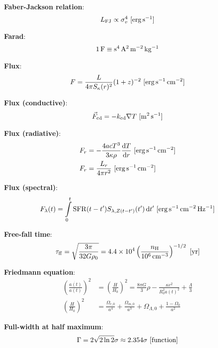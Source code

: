 \documentclass[a4paper,10pt]{article}
\begin{document}
{\noindent}\textbf{Faber-Jackson relation}:
\begin{align*}
    L_\mathrm{FJ} \propto \sigma_v^4 ~ [{\rm erg\,s^{-1}}]
\end{align*}

{\noindent}\textbf{Farad}:
\begin{align*}
    {\rm 1\,F \equiv s^4\,A^2\,m^{-2}\,kg^{-1}}
\end{align*}

{\noindent}\textbf{Flux}:
\begin{align*}
    F = \frac{L}{4\pi S_\kappa(r)^2}(1+z)^{-2} ~ [{\rm erg\,s^{-1}\,cm^{-2}}]
\end{align*}

{\noindent}\textbf{Flux (conductive)}:
\begin{align*}
    \vec{F}_{\rm cd} = -k_{\rm cd}\nabla T ~ [{\rm m^2\,s^{-1}}]
\end{align*}

{\noindent}\textbf{Flux (radiative)}:
\begin{align*}
    F_r &= -\frac{4acT^3}{3\kappa\rho}\frac{{\rm d}T}{{\rm d}r} ~ [{\rm erg\,s^{-1}\,cm^{-2}}] \\
    F_r &=  \frac{L_r}{4\pi r^2} ~ [{\rm erg\,s^{-1}\,cm^{-2}}]
\end{align*}

{\noindent}\textbf{Flux (spectral)}:
\begin{align*}
    F_\lambda(t) = \int\limits_0^t \mathrm{SFR}(t-t')S_{\lambda,Z(t-t')}(t')\,\mathrm{d}t' ~ [{\rm erg\,s^{-1}\,cm^{-2}\,Hz^{-1}}]
\end{align*}

{\noindent}\textbf{Free-fall time}:
\begin{align*}
    \tau_{\rm ff} = \sqrt{\frac{3\pi}{32G\rho_0}} = 4.4\times10^4 \left(\frac{n_{\rm H}}{10^6\,{\rm cm^{-3}}}\right)^{-1/2} ~ [{\rm yr}]
\end{align*}

{\noindent}\textbf{Friedmann equation}:
\begin{align*}
    \left(\frac{\dot{a(t)}}{a(t)}\right)^2 &=  \left(\frac{H}{H_0}\right)^2 = \frac{8\pi G}{3}\rho - \frac{\kappa c^2}{R_0^2a(t)^2} + \frac{\Lambda}{3} \\
    \left(\frac{H}{H_0}\right)^2 &= \frac{\Omega_{r,0}}{a^4} + \frac{\Omega_{m,0}}{a^3} + \Omega_{\Lambda,0} + \frac{1-\Omega_0}{a^2}
\end{align*}

{\noindent}\textbf{Full-width at half maximum}:
\begin{align*}
    \Gamma=2\sqrt{2\ln2}\sigma \approx 2.354\sigma ~ [{\rm function}]
\end{align*}
\end{document}
